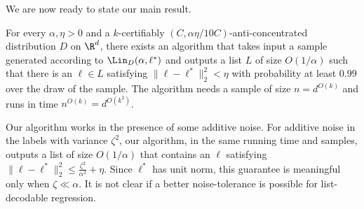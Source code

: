 

We are now ready to state our main result.

\begin{theorem} \label{thm:main}
For every $\alpha, \eta > 0$ and a $k$-certifiably $(C,\alpha \eta/10C)$-anti-concentrated distribution $D$ on $\R^d$, there exists an algorithm that takes input a sample generated according to $\Lin_D(\alpha,\ell^*)$ and outputs a list $L$ of size $O(1/\alpha)$ such that there is an $\ell \in L$ satisfying $\| \ell - \ell^*\|_2^2 < \eta$ with probability at least $0.99$ over the draw of the sample. The algorithm needs a sample of size $n = d^{O(k)}$ and runs in time $n^{O(k)} = d^{O(k^2)}$.
\end{theorem} 


\begin{remark}
Our algorithm works in the presence of some additive noise. For additive noise in the labels with variance $\zeta^2$, our algorithm, in the same running time and samples, outputs a list of size $O(1/\alpha)$ that contains an $\ell$ satisfying $\|\ell-\ell^*\|_2^2 \leq \frac{\zeta^2}{\alpha^2} + \eta$. Since $\ell^*$ has unit norm, this guarantee is meaningful only when $\zeta \ll \alpha$. It is not clear if a better noise-tolerance is possible for list-decodable regression.
\end{remark}



